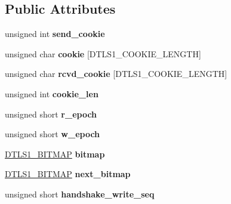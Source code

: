 \subsection*{Public Attributes}
\begin{DoxyCompactItemize}
\item 
\mbox{\label{structdtls1__state__st_af87b8915e3c04aa1e8c858e15a967b2d}} 
unsigned int {\bfseries send\+\_\+cookie}
\item 
\mbox{\label{structdtls1__state__st_a3600731c890da666b152e0bea4b17644}} 
unsigned char {\bfseries cookie} \mbox{[}D\+T\+L\+S1\+\_\+\+C\+O\+O\+K\+I\+E\+\_\+\+L\+E\+N\+G\+TH\mbox{]}
\item 
\mbox{\label{structdtls1__state__st_a1a9425f1e37d872f3cc13026092b4ac6}} 
unsigned char {\bfseries rcvd\+\_\+cookie} \mbox{[}D\+T\+L\+S1\+\_\+\+C\+O\+O\+K\+I\+E\+\_\+\+L\+E\+N\+G\+TH\mbox{]}
\item 
\mbox{\label{structdtls1__state__st_aa91963cca02aa5c981c3c1d5c3c6e472}} 
unsigned int {\bfseries cookie\+\_\+len}
\item 
\mbox{\label{structdtls1__state__st_aa3c8e7915e684e4d99aef7e102c57479}} 
unsigned short {\bfseries r\+\_\+epoch}
\item 
\mbox{\label{structdtls1__state__st_ac2348d97c73af669675caa7791fc7320}} 
unsigned short {\bfseries w\+\_\+epoch}
\item 
\mbox{\label{structdtls1__state__st_a3e9ffaed4676ae794845eed4755ef8ce}} 
\hyperlink{structdtls1__bitmap__st}{D\+T\+L\+S1\+\_\+\+B\+I\+T\+M\+AP} {\bfseries bitmap}
\item 
\mbox{\label{structdtls1__state__st_a2ef30a3f09e71c8d936db1f4a8a68c10}} 
\hyperlink{structdtls1__bitmap__st}{D\+T\+L\+S1\+\_\+\+B\+I\+T\+M\+AP} {\bfseries next\+\_\+bitmap}
\item 
\mbox{\label{structdtls1__state__st_ac14d838ba2fa596ab378ac07bee6e0c8}} 
unsigned short {\bfseries handshake\+\_\+write\+\_\+seq}

\end{DoxyCompactItemize}
